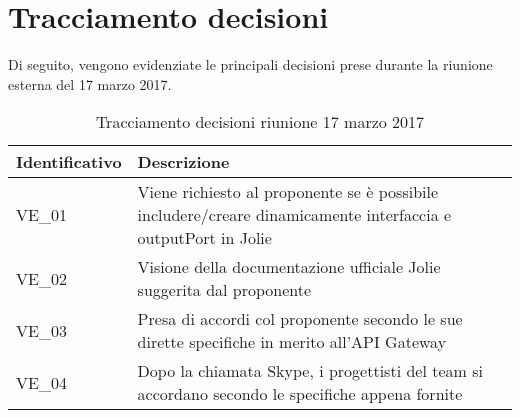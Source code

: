\section{Tracciamento decisioni}
Di seguito, vengono evidenziate le principali decisioni prese durante la riunione esterna del 17 marzo 2017.

\begin{table}[H]
	\begin{center}
		\begin{tabular}{|p{3cm}| p{11cm}|}
			\hline
			\textbf{Identificativo}	& \textbf{Descrizione} \\
			\hline
			VE\_01	& Viene richiesto al proponente se è possibile includere/creare dinamicamente interfaccia e outputPort in Jolie	\\
			\hline
			VE\_02 & Visione della documentazione ufficiale Jolie suggerita dal proponente \\
			\hline
			VE\_03 & Presa di accordi col proponente secondo le sue dirette specifiche in merito all'API Gateway \\
			\hline
			VE\_04 & Dopo la chiamata Skype, i progettisti del team si accordano secondo le specifiche appena fornite \\
			\hline
		\end{tabular}
		\caption{Tracciamento decisioni riunione 17 marzo 2017}
	\end{center}
\end{table}